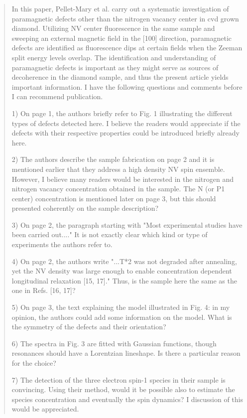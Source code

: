\documentclass{article}
\begin{document}
\begin{quote}
In this paper, Pellet-Mary et al. carry out a systematic investigation of paramagnetic defects other than the nitrogen vacancy center in cvd grown diamond. Utilizing NV center fluorescence in the same sample and sweeping an external magnetic field in the [100] direction, paramagnetic defects are identified as fluorescence dips at certain fields when the Zeeman split energy levels overlap. The identification and understanding of paramagnetic defects is important as they might serve as sources of decoherence in the diamond sample, and thus the present article yields important information. I have the following questions and comments before I can recommend publication.

1) On page 1, the authors briefly refer to Fig. 1 illustrating the different types of defects detected here. I believe the readers would appreciate if the defects with their respective properties could be introduced briefly already here.

2) The authors describe the sample fabrication on page 2 and it is mentioned earlier that they address a high density NV spin ensemble. However, I believe many readers would be interested in the nitrogen and nitrogen vacancy concentration obtained in the sample. The N (or P1 center) concentration is mentioned later on page 3, but this should presented coherently on the sample description?

3) On page 2, the paragraph starting with "Most experimental studies have been carried out...." It is not exactly clear which kind or type of experiments the authors refer to.

4) On page 2, the authors write "...T*2 was not degraded after annealing, yet the NV density was large enough to enable concentration dependent longitudinal relaxation [15, 17]." Thus, is the sample here the same as the one in Refs. [16, 17]?

5) On page 3, the text explaining the model illustrated in Fig. 4: in my opinion, the authors could add some information on the model. What is the symmetry of the defects and their orientation?

6) The spectra in Fig. 3 are fitted with Gaussian functions, though resonances should have a Lorentzian lineshape. Is there a particular reason for the choice?

7) The detection of the three electron spin-1 species in their sample is convincing. Using their method, would it be possible also to estimate the species concentration and eventually the spin dynamics? I discussion of this would be appreciated.


\end{quote}
\end{document}
